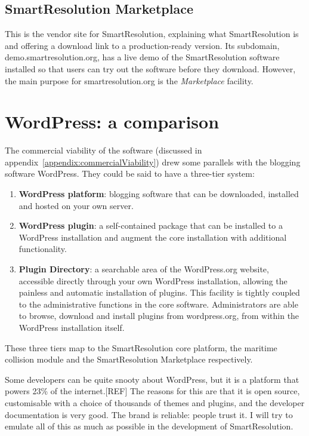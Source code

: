 \subsection{SmartResolution Marketplace}

This is the vendor site for SmartResolution, explaining what SmartResolution is and offering a download link to a production-ready version. Its subdomain, demo.smartresolution.org, has a live demo of the SmartResolution software installed so that users can try out the software before they download. However, the main purpose for smartresolution.org is the \emph{Marketplace} facility.

\section{WordPress: a comparison}

The commercial viability of the software (discussed in appendix~\ref{appendix:commercialViability}) drew some parallels with the blogging software WordPress. They could be said to have a three-tier system:

\begin{enumerate}
    \item \textbf{WordPress platform}: blogging software that can be downloaded, installed and hosted on your own server.
    
    \item \textbf{WordPress plugin}: a self-contained package that can be installed to a WordPress installation and augment the core installation with additional functionality.
    
    \item \textbf{Plugin Directory}: a searchable area of the WordPress.org website, accessible directly through your own WordPress installation, allowing the painless and automatic installation of plugins. This facility is tightly coupled to the administrative functions in the core software. Administrators are able to browse, download and install plugins from wordpress.org, from within the WordPress installation itself. %
\end{enumerate}

These three tiers map to the SmartResolution core platform, the maritime collision module and the SmartResolution Marketplace respectively.

Some developers can be quite snooty about WordPress, but it is a platform that powers 23\% of the internet.[REF] The reasons for this are that it is open source, customisable with a choice of thousands of themes and plugins, and the developer documentation is very good. The brand is reliable: people trust it. I will try to emulate all of this as much as possible in the development of SmartResolution. %

